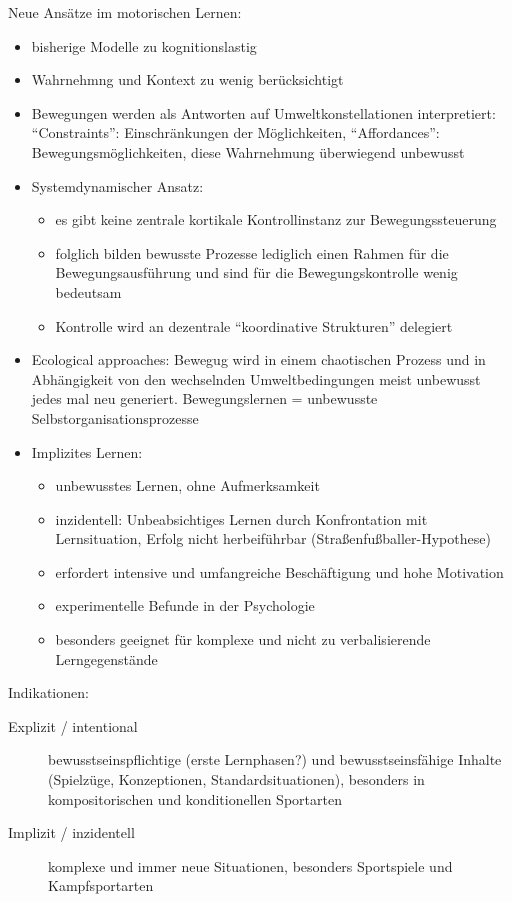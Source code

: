 Neue Ansätze im motorischen Lernen:
\begin{itemize}
    \item bisherige Modelle zu kognitionslastig
    \item Wahrnehmng und Kontext zu wenig berücksichtigt
    \item Bewegungen werden als Antworten auf Umweltkonstellationen interpretiert: ``Constraints'': Einschränkungen der Möglichkeiten, ``Affordances'': Bewegungsmöglichkeiten, diese Wahrnehmung überwiegend unbewusst
    \item Systemdynamischer Ansatz:
    \begin{itemize}
        \item es gibt keine zentrale kortikale Kontrollinstanz zur Bewegungssteuerung
        \item folglich bilden bewusste Prozesse lediglich einen Rahmen für die Bewegungsausführung und sind für die Bewegungskontrolle wenig bedeutsam
        \item Kontrolle wird an dezentrale ``koordinative Strukturen'' delegiert
    \end{itemize}
    \item Ecological approaches: Bewegug wird in einem chaotischen Prozess und in Abhängigkeit von den wechselnden Umweltbedingungen meist unbewusst jedes mal neu generiert. Bewegungslernen = unbewusste Selbstorganisationsprozesse
    \item Implizites Lernen:
    \begin{itemize}
        \item unbewusstes Lernen, ohne Aufmerksamkeit
        \item inzidentell: Unbeabsichtiges Lernen durch Konfrontation mit Lernsituation, Erfolg nicht herbeiführbar (Straßenfußballer-Hypothese)
        \item erfordert intensive und umfangreiche Beschäftigung und hohe Motivation
        \item experimentelle Befunde in der Psychologie
        \item besonders geeignet für komplexe und nicht zu verbalisierende Lerngegenstände
    \end{itemize}
\end{itemize}

Indikationen:
\begin{description}
    \item [Explizit / intentional] bewusstseinspflichtige (erste Lernphasen?) und bewusstseinsfähige Inhalte (Spielzüge, Konzeptionen, Standardsituationen), besonders in kompositorischen und konditionellen Sportarten
    \item [Implizit / inzidentell] komplexe und immer neue Situationen, besonders Sportspiele und Kampfsportarten
\end{description}

